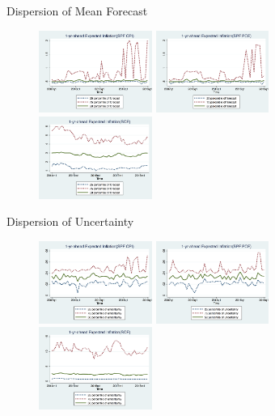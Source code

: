 \documentclass{beamer}
\begin{document}
\begin{frame}{Dispersion of Mean Forecast}
\begin{figure}
	\includegraphics[width=0.33\textwidth]{figuresDraft/IQRmeanCPIQ.png} 
\smallskip
\includegraphics[width=0.33\textwidth]{figuresDraft/IQRmeanPCEQ.png}
\smallskip
\includegraphics[width=0.33\textwidth]{figuresDraft/IQRmeanSCEM.png}
\end{figure}
\end{frame}


\begin{frame}{Dispersion of Uncertainty}
\begin{figure}
	\label{IQR_Unceratitny}
	\includegraphics[width=0.33\textwidth]{figuresDraft/IQRvarCPIQ.png}
\smallskip
\includegraphics[width=0.33\textwidth]{figuresDraft/IQRvarPCEQ.png}
\smallskip
\includegraphics[width=0.33\textwidth]{figuresDraft/IQRvarSCEM.png}
\end{figure}
\end{frame}
\end{document}
